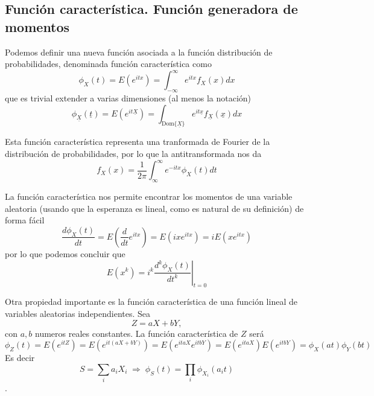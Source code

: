 \documentclass{article}
\numberwithin{equation}{section} %
\begin{document}
\subsection{Función característica. Función generadora de momentos}
Podemos definir una nueva función asociada a la función distribución de probabilidades, denominada función característica como
\begin{equation}
\phi_{X}(t) = E(e^{i t x}) = \int_{-\infty}^{\infty} e^{i t x} f_{X}(x) dx
\end{equation}
que es trivial extender a varias dimensiones (al menos la notación)
\begin{equation}
\phi_{\underline{X}}(\underline{t}) = E(e^{i t \underline{X}}) = \int_{\text{Dom}\{\underline{X}\}} e^{i t \underline{x}} f_{\underline{X}}(\underline{x}) d x
\end{equation}

Esta función característica representa una tranformada de Fourier de la distribución de probabilidades, por lo que la antitransformada nos da
\begin{equation}
f_{X}(x) = \frac{1}{2\pi} \int_{\infty}^{\infty} e^{-i t x} \phi_{X}(t) dt
\end{equation}

La función característica nos permite encontrar los momentos de una variable aleatoria (usando que la esperanza es lineal, como es natural de su definición) de forma fácil
\[\frac{d \phi_{X}(t)}{dt} = E\left( \frac{d}{dt} e^{i t x}\right) = E(i x e^{i t x}) = i E(x e^{i t x}) \]
por lo que podemos concluir que
\begin{equation}
E(x^k) = i^k \left.\frac{d^{k} \phi_{X}(t)}{dt^{k}}\right|_{t=0}
\end{equation}

Otra propiedad importante es la función característica de una función lineal de variables aleatorias independientes. Sea \[Z = a X + b Y,\] con $a, b$ numeros reales constantes. La función característica de $Z$ será \[ \phi_{Z}(t) = E(e^{i t Z}) = E(e^{i t (a X + b Y)}) = E(e^{i t a X} e^{i t b Y}) = E(e^{i t a X}) E(e^{i t b Y}) = \phi_{X}(a t) \phi_{Y}(b t)\]
Es decir
\begin{equation}
S = \sum_{i} a_i X_i \; \Rightarrow \; \phi_{S}(t) = \prod_{i} \phi_{X_i}(a_i t)
\end{equation}.
\end{document}
